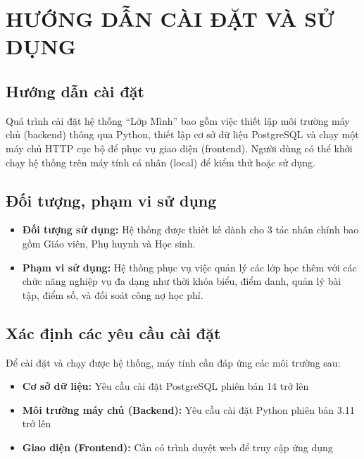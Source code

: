 \chapter{HƯỚNG DẪN CÀI ĐẶT VÀ SỬ DỤNG}
\section{Hướng dẫn cài đặt}
Quá trình cài đặt hệ thống ``Lớp Mình'' bao gồm việc thiết lập môi trường máy chủ (backend) thông qua Python, thiết lập cơ sở dữ liệu PostgreSQL và chạy một máy chủ HTTP cục bộ để phục vụ giao diện (frontend). Người dùng có thể khởi chạy hệ thống trên máy tính cá nhân (local) để kiểm thử hoặc sử dụng.

\section{Đối tượng, phạm vi sử dụng}
\begin{itemize}
    \item \textbf{Đối tượng sử dụng:} Hệ thống được thiết kế dành cho 3 tác nhân chính bao gồm Giáo viên, Phụ huynh và Học sinh.
    \item \textbf{Phạm vi sử dụng:} Hệ thống phục vụ việc quản lý các lớp học thêm với các chức năng nghiệp vụ đa dạng như thời khóa biểu, điểm danh, quản lý bài tập, điểm số, và đối soát công nợ học phí.
\end{itemize}

\section{Xác định các yêu cầu cài đặt}
Để cài đặt và chạy được hệ thống, máy tính cần đáp ứng các môi trường sau:
\begin{itemize}
\item \textbf{Cơ sở dữ liệu:} Yêu cầu cài đặt PostgreSQL phiên bản 14 trở lên
\item \textbf{Môi trường máy chủ (Backend):} Yêu cầu cài đặt Python phiên bản 3.11 trở lên
\item \textbf{Giao diện (Frontend):} Cần có trình duyệt web để truy cập ứng dụng
\end{itemize}

